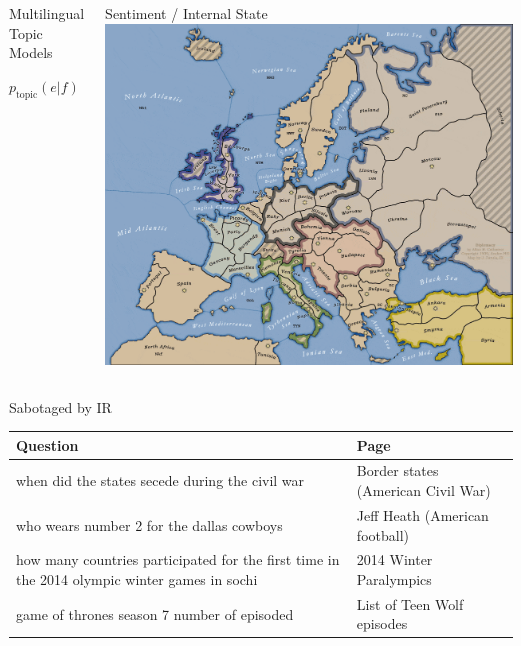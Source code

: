 \documentclass[xcolor=dvipsnames,xcolor=table]{beamer}
\begin{document}
{\begin{columns}
    \begin{block}{Multilingual Topic Models}
      \begin{center}
        \begin{large}
          $p_{\mbox{topic}}(e | f)$ \\
         \end{large}
      \cite{eidelman-12,hu-14}
       \end{center}
    \vspace{-.3cm}
    \end{block}


    \begin{block}{Sentiment / Internal State}
    \centering
        \includegraphics[width=0.4\linewidth]{general_figures/diplomacy} \\
        \cite{niculae-15,sayeed-12,boyd-graber-10}
    \end{block}




\end{columns}

}

\begin{frame}{Sabotaged by IR}

  \begin{small}
  \begin{tabular}{p{7cm}p{3cm}}
    \toprule
    Question & Page \\
    \hline
 when did the states secede during the civil war &  Border states (American Civil War) \\
 who wears number 2 for the dallas cowboys &  Jeff Heath (American football) \\
 how many countries participated for the first time in the 2014 olympic winter games in sochi & 2014 Winter Paralympics \\
 game of thrones season 7 number of episoded &  List of Teen Wolf episodes \\
 \bottomrule
  \end{tabular}
  \end{small}

\end{frame}
\end{document}
